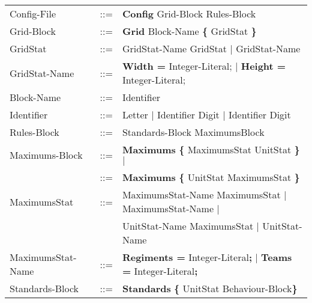 \begin{center}
\begin{longtable}{ l l l }
				Config-File		   & 	::=  & {\bf Config} Grid-Block Rules-Block  		\\
				Grid-Block		   &	::=	 & {\bf Grid} Block-Name	 {\bf \{} GridStat \bf{\}} \\
				GridStat		   &	::=  & GridStat-Name GridStat $\mid$ GridStat-Name   \\
				GridStat-Name	   &	::=  & {\bf Width = } Integer-Literal; $\mid$ {\bf Height = } Integer-Literal; \\
				Block-Name		   &	::=  & Identifier							\\
				Identifier		   &    ::=  & Letter $\mid$ Identifier Digit $\mid$ Identifier Digit \\
				Rules-Block		   &	::=	 & Standards-Block MaximumsBlock 				\\
				Maximums-Block	   &	::=	 & {\bf Maximums} {\bf \{} MaximumsStat UnitStat {\bf \}} $\mid$ \\
				 				   &	::=	 & {\bf Maximums} {\bf \{} UnitStat MaximumsStat {\bf \}}	\\
				MaximumsStat	   &	::=  & MaximumsStat-Name MaximumsStat $\mid$ MaximumsStat-Name $\mid$		\\
								   &	     & UnitStat-Name MaximumsStat $\mid$ UnitStat-Name			\\
				MaximumsStat-Name  &	::=  & {\bf Regiments = } Integer-Literal{\bf ;} $\mid$ {\bf Teams = } Integer-Literal{\bf ;} \\
				Standards-Block	   &    ::=  & {\bf Standards} {\bf \{ } UnitStat Behaviour-Block\bf{\} }		\\
				\end{longtable}
		\end{center}
		
